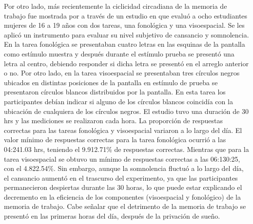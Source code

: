 \documentclass[12pt,letterpaper,final]{article}
\newcommand{\rpm}{\raisebox{.2ex}{$\scriptstyle\pm$}} %
\begin{document}
Por otro lado, más recientemente la ciclicidad circadiana de la memoria de trabajo fue mostrada por  a través de un estudio en que evaluó a ocho estudiantes mujeres de 16 a 19 años con dos tareas, una fonológica y una visoespacial.
Se les aplicó un instrumento para evaluar su nivel subjetivo de cansancio y somnolencia.
En la tarea fonológica se presentaban cuatro letras en las esquinas de la pantalla como estímulo muestra y después durante el estímulo prueba se presentó una letra al centro,  %
debiendo responder si dicha letra se presentó en el arreglo anterior o no.
Por otro lado, en la tarea visoespacial se presentaban tres círculos negros ubicados en distintas posiciones de la pantalla%
 en estímulo de prueba se presentaron círculos blancos distribuidos por la pantalla. En esta tarea los participantes debían indicar si alguno de los círculos blancos coincidía con la ubicación de cualquiera de los círculos negros. El estudio tuvo una duración de 30 hrs y las mediciones se realizaron cada hora.
La proporción de respuestas correctas para las tareas fonológica y visoespacial variaron a lo largo del día. El valor mínimo de respuestas correctas para la tarea fonológica ocurrió a las 04:24\rpm 1.03 hrs, teniendo el 9.91\rpm 2.71\% de respuestas correctas. Mientras que para  la tarea visoespacial se obtuvo un mínimo de respuestas correctas a las 06:13\rpm 0:25, con el 4.82\rpm 2.54\%. Sin embargo, aunque la somnolencia fluctuó a lo largo del día, el cansancio aumentó en el trascurso del experimento, ya que las participantes permanecieron despiertas durante las 30 horas, lo que puede estar explicando el decremento en la eficiencia de los componentes (visoespacial y fonológico) de la memoria de trabajo. Cabe señalar que el detrimento de la memoria de trabajo se presentó en las primeras horas del día, después de la privación de sueño.
\end{document}
